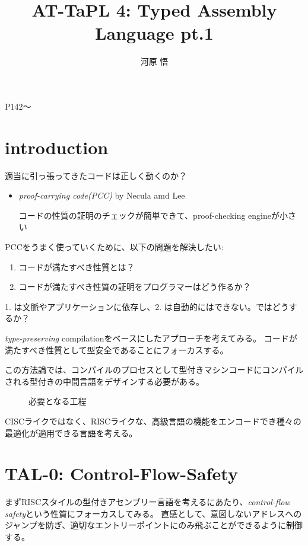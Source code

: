\documentclass[a4paper,oneside]{ltjsarticle}
\title{AT-TaPL 4: Typed Assembly Language pt.1}
\author{河原 悟}
\begin{document}
\maketitle
P142〜

\setcounter{section}{-1}
\section{introduction}
適当に引っ張ってきたコードは正しく動くのか？
\begin{itemize}
	\item \textit{proof-carrying code(PCC)} by Necula amd Lee

		コードの性質の証明のチェックが簡単できて、proof-checking engineが小さい
\end{itemize}

PCCをうまく使っていくために、以下の問題を解決したい:

\begin{enumerate}
	\item コードが満たすべき性質とは？
	\item コードが満たすべき性質の証明をプログラマーはどう作るか？
\end{enumerate}

1. は文脈やアプリケーションに依存し、2. は自動的にはできない。ではどうするか？

\textit{type-preserving} compilationをベースにしたアプローチを考えてみる。
コードが満たすべき性質として型安全であることにフォーカスする。

この方法論では、コンパイルのプロセスとして型付きマシンコードにコンパイルされる型付きの中間言語をデザインする必要がある。
\begin{figure}[ht]
	\centering
	\caption{必要となる工程}
\end{figure}

CISCライクではなく、RISCライクな、高級言語の機能をエンコードでき種々の最適化が適用できる言語を考える。

\section{TAL-0: Control-Flow-Safety}
まずRISCスタイルの型付きアセンブリー言語を考えるにあたり、\textit{control-flow safety}という性質にフォーカスしてみる。
直感として、意図しないアドレスへのジャンプを防ぎ、適切なエントリーポイントにのみ飛ぶことができるように制御する。
\end{document}
